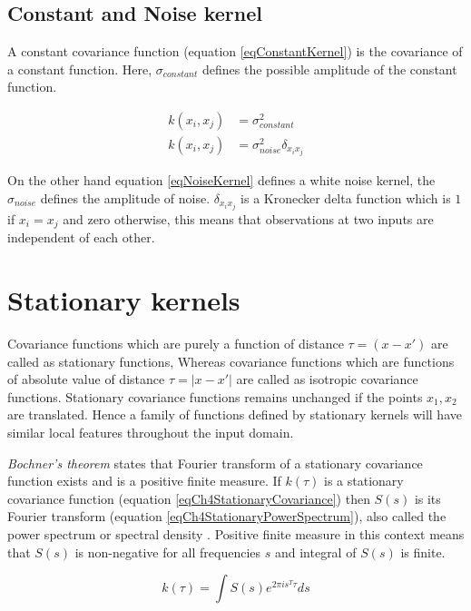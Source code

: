 \subsection{Constant and Noise kernel}
A constant covariance function (equation \ref{eqConstantKernel}) is the covariance of a constant function. Here, $\sigma_{constant}$ defines the possible amplitude of the constant function.

\begin{align}
k(x_{i}, x_{j}) & = \sigma^2_{constant} \label{eqConstantKernel} \\
k(x_{i}, x_{j}) & = \sigma^2_{noise}\delta_{x_{i}x_{j}} \label{eqNoiseKernel}
\end{align}

On the other hand equation \ref{eqNoiseKernel} defines a white noise kernel, the $\sigma_{noise}$ defines the amplitude of noise. $\delta_{x_{i}x_{j}}$ is a Kronecker delta function which is $1$ if $x_{i} = x_{j}$ and zero otherwise, this means that observations at two inputs are independent of each other.

\section{Stationary kernels} \label{secStationaryKernels}
Covariance functions which are purely a function of distance $\tau = (x-x')$ are called as stationary functions, Whereas covariance functions which are functions of absolute value of distance $\tau = |x-x'|$ are called as isotropic covariance functions. Stationary covariance functions remains unchanged if the points $x_{1}, x_{2}$ are translated. Hence a family of functions defined by stationary kernels will have similar local features throughout the input domain. 

\textit{Bochner's theorem} states that Fourier transform of a stationary covariance function exists and is a positive finite measure. If $k(\tau)$ is a stationary covariance function (equation \ref{eqCh4StationaryCovariance}) then $S(s)$ is its Fourier transform (equation \ref{eqCh4StationaryPowerSpectrum}), also called the power spectrum or spectral density \cite{bochner1959lectures, Stein1999Springer, cox1977theory}. Positive finite measure in this context means that $S(s)$ is non-negative for all frequencies $s$ and integral of $S(s)$ is finite.

\begin{equation}\label{eqCh4StationaryCovariance}
    k(\tau) = \int S(s) e^{2 \pi is^{T} \tau}ds
\end{equation}


